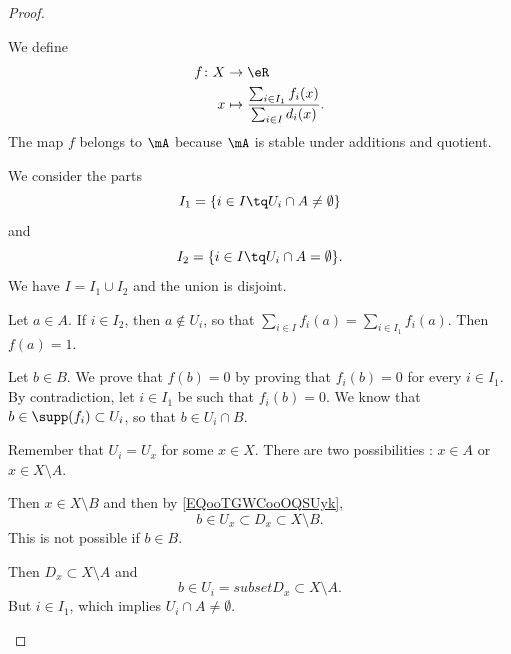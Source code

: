 \begin{proof}
\begin{subproof}
		We define
		\begin{equation}
			\begin{aligned}
				f\colon X & \to \eR                                                         \\
				x         & \mapsto    \frac{ \sum_{i\in I_1}f_i(x) }{\sum_{i\in I}d_i(x)}.
			\end{aligned}
		\end{equation}
		The map \( f\) belongs to \( \mA\) because \( \mA\) is stable under additions and quotient.

		\spitem[\( I_1,I_2\)]
		We consider the parts
		\begin{equation}
			I_1=\{ i\in I\tq U_i\cap A\neq\emptyset \}
		\end{equation}
		and
		\begin{equation}
			I_2=\{ i\in I\tq U_i\cap A=\emptyset \}.
		\end{equation}
		We have \( I=I_1\cup I_2\) and the union is disjoint.

		\spitem[\( f(A)=\{ 1 \}\)]
		Let \( a\in A\). If \( i\in I_2\), then \( a\not\in U_i\), so that \( \sum_{i\in I}f_i(a)=\sum_{i\in I_1}f_i(a)\). Then \( f(a)=1\).

		\spitem[\( f(B)=\{ 0 \}\)]
		Let \( b\in B\). We prove that \( f(b)=0\) by proving that \( f_i(b)=0\) for every \( i\in I_1\). By contradiction, let \( i\in I_1\) be such that \( f_i(b)=0\). We know that \( b\in\supp(f_i)\subset U_i\), so that \( b\in U_i\cap B\).

		Remember that \( U_i=U_x\) for some \( x\in X\). There are two possibilities : \( x\in A\) or \( x\in X\setminus A\).
		\begin{subproof}
			\spitem[If \( x\in A\)]
			Then \( x\in X\setminus B\) and then by \eqref{EQooTGWCooOQSUyk},
			\begin{equation}
				b\in U_x\subset D_x\subset X\setminus B.
			\end{equation}
			This is not possible if \( b\in B\).

			\spitem[If \( x\not\in A\)]
			Then \( D_x\subset X\setminus A\) and
			\begin{equation}
				b\in U_i=subset D_x\subset X\setminus A.
			\end{equation}
			But \( i\in I_1\), which implies \( U_i\cap A\neq\emptyset\).
		\end{subproof}
	\end{subproof}
\end{proof}


